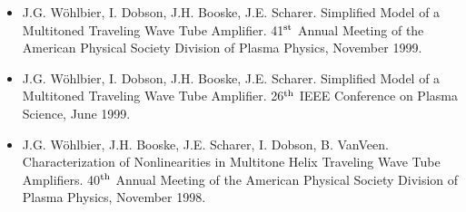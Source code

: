 \begin{itemize}
\item J.G. W\"ohlbier, I. Dobson, J.H. Booske, J.E. Scharer.
  Simplified Model of a Multitoned Traveling Wave Tube Amplifier.
  41$^{\rm st}$ Annual Meeting of the American Physical Society Division
  of Plasma Physics, November 1999.
\item J.G. W\"ohlbier, I. Dobson, J.H. Booske, J.E. Scharer.
  Simplified Model of a Multitoned Traveling Wave Tube Amplifier.
  26$^{\rm th}$ IEEE Conference on Plasma Science, June 1999.
\item J.G. W\"ohlbier, J.H. Booske, J.E. Scharer, I. Dobson, B. VanVeen.
  Characterization of Nonlinearities in Multitone Helix Traveling Wave Tube
  Amplifiers.
  40$^{\rm th}$ Annual Meeting of the American Physical Society Division
  of Plasma Physics, November 1998.
\end{itemize}
